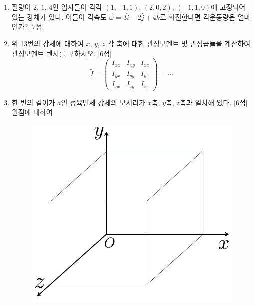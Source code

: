 \documentclass[a4paper,11pt,fleqn]{article}   %
\newcommand{\n}{\newline}
\begin{document}
\begin{enumerate}[start=13]

	\item 질량이 $2$, $1$, $4$인 입자들이 각각 $(1, -1, 1)$, $(2, 0, 2)$, $(-1,1,0)$에 고정되어 있는 강체가 있다. 이들이 각속도 $\vec{\omega} = 3 \hat{i} -2 \hat{j} +4 \hat{k}$로 회전한다면 각운동량은 얼마인가?  [7점]
\n\n\n\n\n\n\n\n

	\item 위 13번의 강체에 대하여 $x$, $y$, $z$ 각 축에 대한 관성모멘트 및 관성곱들을 계산하여 관성모멘트 텐서를 구하시오. [6점]	
\n
\[
	\tilde{I} = \begin{pmatrix}
		I_{xx} & I_{xy} & I_{xz} \\
		I_{yx} & I_{yy} & I_{yz} \\
		I_{zx} & I_{zy} & I_{zz}
	\end{pmatrix} = \cdots
\]
\n\n
	
	
	
\newpage		
	
	\item 한 변의 길이가 $a$인 정육면체 강체의 모서리가 $x$축, $y$축, $z$축과 일치해 있다. [6점] \n
	원점에 대하여 \n
	
	\begin{figure}[h]
		\begin{center}
			\includegraphics[scale=0.4]{img/cube}
		\end{center}
	\end{figure}	
	

\end{enumerate}
\end{document}
